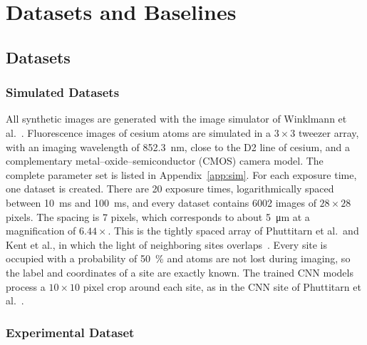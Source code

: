 \section{Datasets and Baselines}\label{sec:simbase}

\subsection{Datasets}
\subsubsection{Simulated Datasets}
All synthetic images are generated with the image simulator of Winklmann et al.~\cite{winklmann2023}.
Fluorescence images of cesium atoms are simulated in a $3\times3$ tweezer array, with an imaging wavelength of \SI{852.3}{\nano\metre}, close to the D2 line of cesium, and a complementary metal--oxide--semiconductor (CMOS) camera model.
The complete parameter set is listed in Appendix~\ref{app:sim}. For each exposure time, one dataset is created.
There are 20 exposure times, logarithmically spaced between \SI{10}{\milli\second} and \SI{100}{\milli\second}, and every dataset contains 6002 images of $28\times28$ pixels.
The spacing is 7 pixels, which corresponds to about \SI{5}{\micro\metre} at a magnification of $6.44\times$.
This is the tightly spaced array of Phuttitarn et al.\ and Kent et al., in which the light of neighboring sites overlaps~\cite{phuttitarn2023,kent2025}.
Every site is occupied with a probability of \SI{50}{\percent} and atoms are not lost during imaging, so the label and coordinates of a site are exactly known.
The trained CNN models process a $10\times10$ pixel crop around each site, as in the CNN site of Phuttitarn et al.~\cite{phuttitarn2023}.

\subsubsection{Experimental Dataset}

